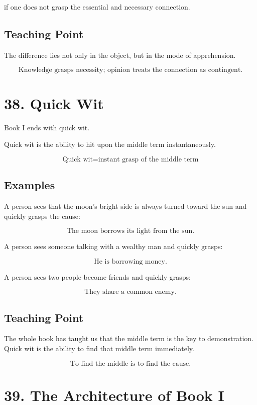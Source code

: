 \documentclass[12pt]{article}
\begin{document}
if one does not grasp the essential and necessary connection.

\subsection*{Teaching Point}

The difference lies not only in the object, but in the mode of apprehension.

\[
\boxed{
\text{Knowledge grasps necessity; opinion treats the connection as contingent.}
}
\]

\section*{38. Quick Wit}

Book I ends with quick wit.

Quick wit is the ability to hit upon the middle term instantaneously.

\[
\boxed{
\text{Quick wit} = \text{instant grasp of the middle term}
}
\]

\subsection*{Examples}

A person sees that the moon's bright side is always turned toward the sun and
quickly grasps the cause:

\[
\text{The moon borrows its light from the sun.}
\]

A person sees someone talking with a wealthy man and quickly grasps:

\[
\text{He is borrowing money.}
\]

A person sees two people become friends and quickly grasps:

\[
\text{They share a common enemy.}
\]

\subsection*{Teaching Point}

The whole book has taught us that the middle term is the key to demonstration.
Quick wit is the ability to find that middle term immediately.

\[
\boxed{
\text{To find the middle is to find the cause.}
}
\]

\section*{39. The Architecture of Book I}
\end{document}
